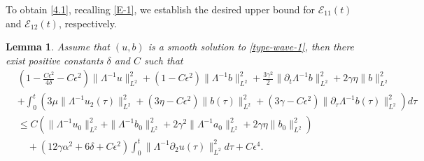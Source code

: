 \documentclass[reqno,11pt]{amsart}
\newtheorem{Lem}[Thm]{Lemma}
\numberwithin{Thm}{section}
\begin{document}
 To obtain \eqref{4.1}, recalling \eqref{E-1}, we establish the desired upper bound for $\mathcal{E}_{11}(t)$ and $\mathcal{E}_{12}(t)$, respectively.
\begin{Lem}
Assume that $(u,b)$ is a smooth solution to \eqref{type-wave-1}, then there exist positive constants $\delta$ and $C$ such that
\begin{align}\label{FF}
&(1-\frac{C\epsilon^2}{4\delta}-C\epsilon^2)\|\Lambda^{-1} u\|^2_{L^2}+(1-C\epsilon^2)\|\Lambda^{-1} b\|^2_{L^2}+\frac{3\gamma^2}{2}\|\partial_t\Lambda^{-1}b\|^2_{L^2}
+2\gamma\eta\|b\|^2_{L^2}\nonumber\\
&+\int_0^t\left(3\mu\|\Lambda^{-1}u_2(\tau)\|^2_{L^2}+(3\eta-C\epsilon^2)\|b(\tau)\|^2_{L^2}+(3\gamma-C\epsilon^2)\|\partial_{\tau}\Lambda^{-1}b(\tau)\|^2_{L^2}\right)d\tau\nonumber\\
&\leq
C\left(\|\Lambda^{-1} u_0\|^2_{L^2}+\|\Lambda^{-1} b_0\|^2_{L^2}+2\gamma^2\|\Lambda^{-1}a_0\|^2_{L^2}
+2\gamma\eta\|b_0\|^2_{L^2}\right)\nonumber\\
&\quad+\left(12\gamma\alpha^2+6\delta+C\epsilon^2\right)\int_0^t\|\Lambda^{-1}\partial_2u(\tau)\|_{L^2}^2d\tau+C\epsilon^4.
\end{align}
\end{Lem}
\end{document}
